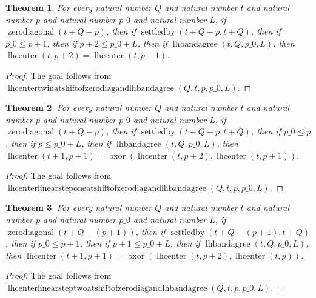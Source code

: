 \documentclass[11pt]{article}
\newtheorem{theorem}{Theorem}[section]
\theoremstyle{definition}
\begin{document}
\begin{theorem}
\label{ll:paper:lhcenter-twin-at-shift-of-zero-diag-and-lhbandagree}
For every natural number \(Q\) and natural number \(t\) and natural number \(p\) and natural number \(p\_0\) and natural number \(L\), if \(\operatorname{zerodiagonal}(t + Q - p)\), then if \(\operatorname{settledby}(t + Q - p, t + Q)\), then if \(p\_0 \le p + 1\), then if \(p + 2 \le p\_0 + L\), then if \(\operatorname{lhbandagree}(t, Q, p\_0, L)\), then \(\operatorname{lhcenter}(t, p + 2) = \operatorname{lhcenter}(t, p + 1)\).
\end{theorem}
\begin{proof}
The goal follows from \(\operatorname{lhcentertwinatshiftofzerodiagandlhbandagree}(Q, t, p, p\_0, L)\).
\end{proof}
\begin{theorem}
\label{ll:paper:lhcenter-linear-step-one-at-shift-of-zero-diag-and-lhbandagree}
For every natural number \(Q\) and natural number \(t\) and natural number \(p\) and natural number \(p\_0\) and natural number \(L\), if \(\operatorname{zerodiagonal}(t + Q - p)\), then if \(\operatorname{settledby}(t + Q - p, t + Q)\), then if \(p\_0 \le p\), then if \(p \le p\_0 + L\), then if \(\operatorname{lhbandagree}(t, Q, p\_0, L)\), then \(\operatorname{lhcenter}(t + 1, p + 1) = \operatorname{bxor}(\operatorname{lhcenter}(t, p + 2), \operatorname{lhcenter}(t, p + 1))\).
\end{theorem}
\begin{proof}
The goal follows from \(\operatorname{lhcenterlinearsteponeatshiftofzerodiagandlhbandagree}(Q, t, p, p\_0, L)\).
\end{proof}
\begin{theorem}
\label{ll:paper:lhcenter-linear-step-two-at-shift-of-zero-diag-and-lhbandagree}
For every natural number \(Q\) and natural number \(t\) and natural number \(p\) and natural number \(p\_0\) and natural number \(L\), if \(\operatorname{zerodiagonal}(t + Q - (p + 1))\), then if \(\operatorname{settledby}(t + Q - (p + 1), t + Q)\), then if \(p\_0 \le p + 1\), then if \(p + 1 \le p\_0 + L\), then if \(\operatorname{lhbandagree}(t, Q, p\_0, L)\), then \(\operatorname{lhcenter}(t + 1, p + 1) = \operatorname{bxor}(\operatorname{lhcenter}(t, p + 2), \operatorname{lhcenter}(t, p))\).
\end{theorem}
\begin{proof}
The goal follows from \(\operatorname{lhcenterlinearsteptwoatshiftofzerodiagandlhbandagree}(Q, t, p, p\_0, L)\).
\end{proof}
\end{document}
